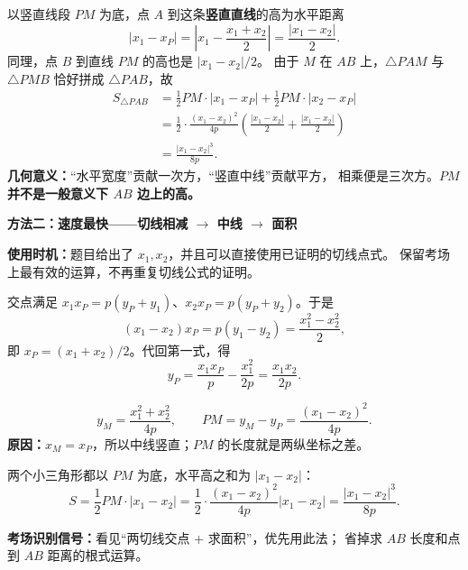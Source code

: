 \begin{proofbox}
\begin{description}[style=nextline, leftmargin=2.8em, labelsep=0.5em, itemsep=0.55em]
        \item[\textbf{第五步（把三角形分成左右两块求面积）：}]
        以竖直线段 $PM$ 为底，点 $A$ 到这条\textbf{竖直直线}的高为水平距离
        \[
            |x_1-x_P|=\left|x_1-\frac{x_1+x_2}{2}\right|
            =\frac{|x_1-x_2|}{2}.
        \]
        同理，点 $B$ 到直线 $PM$ 的高也是 $|x_1-x_2|/2$。
        由于 $M$ 在 $AB$ 上，$\triangle PAM$ 与 $\triangle PMB$ 恰好拼成 $\triangle PAB$，故
        \[
        \begin{aligned}
            S_{\triangle PAB}
            &=\frac12 PM\cdot|x_1-x_P|
             +\frac12 PM\cdot|x_2-x_P|\\
            &=\frac12\cdot\frac{(x_1-x_2)^2}{4p}
                \left(\frac{|x_1-x_2|}{2}+\frac{|x_1-x_2|}{2}\right)\\
            &=\boxed{\frac{|x_1-x_2|^3}{8p}}.
        \end{aligned}
        \]
        \textbf{几何意义：}“水平宽度”贡献一次方，“竖直中线”贡献平方，
        相乘便是三次方。\textbf{$PM$ 并不是一般意义下 $AB$ 边上的高。}
    \end{description}

    \medskip
    \par\noindent\begin{minipage}{\linewidth}
    \textbf{\textcolor{CProof}{方法二：速度最快——切线相减 $\to$ 中线 $\to$ 面积}}

    
    \end{minipage}\par

    \textbf{使用时机：}题目给出了 $x_1,x_2$，并且可以直接使用已证明的切线点式。
    保留考场上最有效的运算，不再重复切线公式的证明。

    \begin{description}[style=nextline, leftmargin=2.8em, labelsep=0.5em, itemsep=0.5em]
        \item[\textbf{第一步（相减确定 $P$）：}]
        交点满足 $x_1x_P=p(y_P+y_1)$、$x_2x_P=p(y_P+y_2)$。于是
        \[
            (x_1-x_2)x_P=p(y_1-y_2)
            =\frac{x_1^2-x_2^2}{2},
        \]
        即 $x_P=(x_1+x_2)/2$。代回第一式，得
        \[
            y_P=\frac{x_1x_P}{p}-\frac{x_1^2}{2p}
            =\frac{x_1x_2}{2p}.
        \]
        \item[\textbf{第二步（平方差求中线）：}]
        \[
            y_M=\frac{x_1^2+x_2^2}{4p},\qquad
            PM=y_M-y_P=\frac{(x_1-x_2)^2}{4p}.
        \]
        \textbf{原因：}$x_M=x_P$，所以中线竖直；$PM$ 的长度就是两纵坐标之差。
        \item[\textbf{第三步（代一次面积公式）：}]
        两个小三角形都以 $PM$ 为底，水平高之和为 $|x_1-x_2|$：
        \[
            \boxed{S=\frac12 PM\cdot|x_1-x_2|
            =\frac12\cdot\frac{(x_1-x_2)^2}{4p}|x_1-x_2|
            =\frac{|x_1-x_2|^3}{8p}}.
        \]
    \end{description}
    \textbf{考场识别信号：}看见“两切线交点 + 求面积”，优先用此法；
    省掉求 $AB$ 长度和点到 $AB$ 距离的根式运算。


\end{proofbox}
